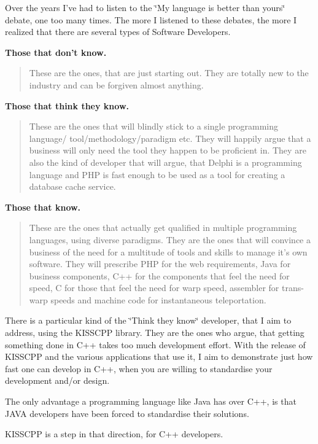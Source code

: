 Over the years I've had to listen to the \char`\"{}\-My language is better than yours\char`\"{} debate, one too many times. The more I listened to these debates, the more I realized that there are several types of Software Developers.


\begin{DoxyEnumerate}
\item {\bfseries Those that don't know.} \begin{quotation}
These are the ones, that are just starting out. They are totally new to the industry and can be forgiven almost anything.

\end{quotation}

\item {\bfseries Those that think they know.} \begin{quotation}
These are the ones that will blindly stick to a single programming language/ tool/methodology/paradigm etc. They will happily argue that a business will only need the tool they happen to be proficient in. They are also the kind of developer that will argue, that Delphi is a programming language and P\-H\-P is fast enough to be used as a tool for creating a database cache service.

\end{quotation}

\item {\bfseries Those that know.} \begin{quotation}
These are the ones that actually get qualified in multiple programming languages, using diverse paradigms. They are the ones that will convince a business of the need for a multitude of tools and skills to manage it's own software. They will prescribe P\-H\-P for the web requirements, Java for business components, C++ for the components that feel the need for speed, C for those that feel the need for warp speed, assembler for trans-\/warp speeds and machine code for instantaneous teleportation.

\end{quotation}

\end{DoxyEnumerate}

There is a particular kind of the \char`\"{}\-Think they know\char`\"{} developer, that I aim to address, using the K\-I\-S\-S\-C\-P\-P library. They are the ones who argue, that getting something done in C++ takes too much development effort. With the release of K\-I\-S\-S\-C\-P\-P and the various applications that use it, I aim to demonstrate just how fast one can develop in C++, when you are willing to standardise your development and/or design.

The only advantage a programming language like Java has over C++, is that J\-A\-V\-A developers have been forced to standardise their solutions.

K\-I\-S\-S\-C\-P\-P is a step in that direction, for C++ developers. 